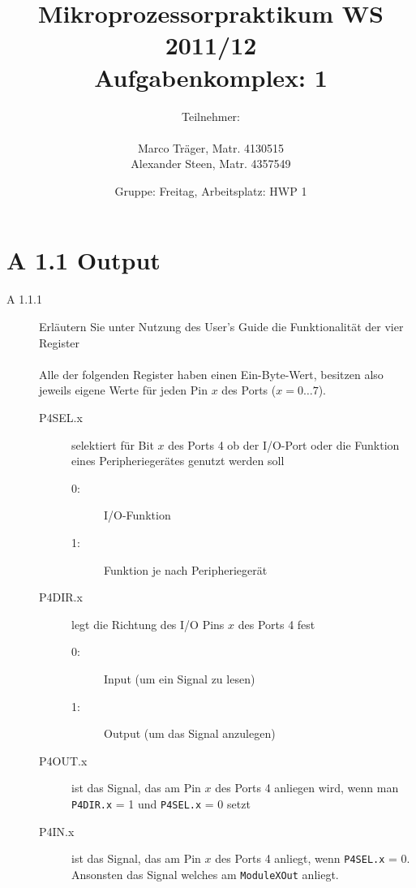 \documentclass[11pt,a4paper,ngerman]{article}
\author{Teilnehmer:\\ \\Marco Träger, Matr. 4130515\\Alexander Steen, Matr. 4357549}
\date{Gruppe: Freitag, Arbeitsplatz: HWP 1}
\title{Mikroprozessorpraktikum WS 2011/12\\ Aufgabenkomplex: 1}
\begin{document}

\maketitle
\thispagestyle{fancy}
\newpage
\section*{A 1.1 Output}

\begin{description}
	\item[A 1.1.1] Erläutern Sie unter Nutzung des User's Guide die Funktionalität der vier Register \\ \\
Alle der folgenden Register haben einen Ein-Byte-Wert, besitzen also jeweils eigene Werte für jeden Pin $x$ des Ports ($x = 0\ldots 7$).
		\begin{description}
			\item[P4SEL.x] selektiert für Bit $x$ des Ports 4 ob der I/O-Port oder die Funktion eines Peripheriegerätes genutzt werden soll
			\begin{description}
				\item[0:] I/O-Funktion
				\item[1:] Funktion je nach Peripheriegerät
			\end{description}
			\item[P4DIR.x] legt die Richtung des I/O Pins $x$ des Ports 4 fest
			\begin{description}
				\item[0:] Input (um ein Signal zu lesen)
				\item[1:] Output (um das Signal anzulegen)
			\end{description}
			\item[P4OUT.x] ist das Signal, das am Pin $x$ des Ports 4 anliegen wird, wenn man \texttt{P4DIR.x} = 1 und \texttt{P4SEL.x} = 0 setzt
			\item[P4IN.x] ist das Signal, das am Pin $x$ des Ports 4 anliegt, wenn \texttt{P4SEL.x} = 0. Ansonsten das Signal welches am \texttt{ModuleXOut} anliegt.
		\end{description}
	


\end{description}
\end{document}
